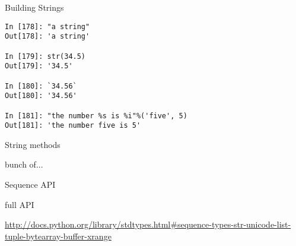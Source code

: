 \documentclass{beamer}
\begin{document}
\begin{frame}[fragile]{Building Strings}

\begin{verbatim}
In [178]: "a string"
Out[178]: 'a string'

In [179]: str(34.5)
Out[179]: '34.5'

In [180]: `34.56`
Out[180]: '34.56'

In [181]: "the number %s is %i"%('five', 5)
Out[181]: 'the number five is 5'
\end{verbatim}

\end{frame} 


\begin{frame}{String methods}

  {\Large bunch of...}

\end{frame}

\begin{frame}{Sequence API}

  {\Large full API}

\url{http://docs.python.org/library/stdtypes.html#sequence-types-str-unicode-list-tuple-bytearray-buffer-xrange}

\end{frame}
\end{document}
